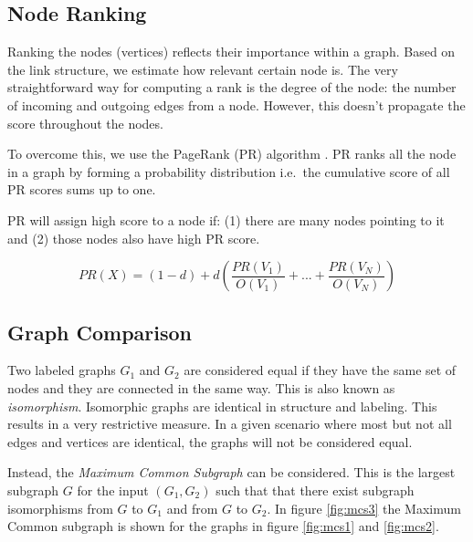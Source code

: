 
\subsection{Node Ranking}
Ranking the nodes (vertices) reflects their importance within a graph. 
Based on the link structure, we estimate how relevant certain node is.
The very straightforward way for computing a rank is the degree of the node: the number of incoming and outgoing  edges from a node. However, this doesn’t propagate the score throughout the nodes.

To overcome this, we use the PageRank (PR) algorithm \cite{PageRank}. PR ranks all the node in a graph by forming a probability distribution i.e.\ the cumulative score of all PR scores sums up to one. 

PR will assign high score to a node if: (1) there are many nodes pointing to it and (2) those nodes also have high PR score.


\begin{equation}
	PR(X) = (1-d) + d(\dfrac{PR(V_{1})}{O(V_{1})} + ... + \dfrac{PR(V_{N})}{O(V_{N})})
\end{equation}

\subsection{Graph Comparison}

Two labeled graphs $G_{1}$ and $G_{2}$ are considered equal if they have the same set of nodes and they are connected in the same way. 
This is also known as \emph{isomorphism}\cite{Wilson:1986:IGT:22577}. 
Isomorphic graphs are identical in structure and labeling. 
This results in a very restrictive measure. 
In a given scenario where most but not all edges and vertices are identical,
the graphs will not be considered equal.

Instead, the \emph{Maximum Common Subgraph} can be considered.
This is the largest subgraph $G$ for the input $(G_{1},G_{2})$ 
such that that there exist subgraph isomorphisms from $G$ to $G_{1}$ and from $G$ to $G_{2}$.
In figure \ref{fig:mcs3} the Maximum Common subgraph is shown for the graphs in figure \ref{fig:mcs1} and \ref{fig:mcs2}.

